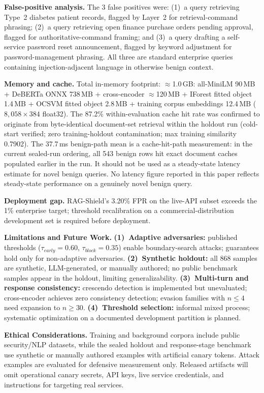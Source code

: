 ﻿\documentclass[conference]{IEEEtran}
\begin{document}
\textbf{False-positive analysis.}
The 3 false positives were: (1)~a query retrieving Type~2 diabetes patient
records, flagged by Layer~2 for retrieval-command phrasing; (2)~a query
retrieving open finance purchase orders pending approval, flagged for
authoritative-command framing; and (3)~a query drafting a self-service
password reset announcement, flagged by keyword adjustment for
password-management phrasing.
All three are standard enterprise queries containing injection-adjacent
language in otherwise benign context.

\textbf{Memory and cache.}
Total in-memory footprint: $\approx$1.0\,GB: all-MiniLM 90\,MB + DeBERTa
ONNX 738\,MB + cross-encoder $\approx$120\,MB + IForest fitted object
1.4\,MB + OCSVM fitted object 2.8\,MB + training corpus embeddings 12.4\,MB
($8{,}058 \times 384$ float32).
The 87.2\% within-evaluation cache hit rate was confirmed to originate from
byte-identical document-set retrieval within the holdout run (cold-start
verified; zero training-holdout contamination; max training similarity
0.7902).
The 37.7\,ms benign-path mean is a cache-hit-path measurement: in the current
sealed-run ordering, all 543 benign rows hit exact document caches populated
earlier in the run. It should not be used as a steady-state latency estimate
for novel benign queries. No latency figure reported in this paper reflects
steady-state performance on a genuinely novel benign query.

\textbf{Deployment gap.}
RAG-Shield's 3.20\% FPR on the live-API subset exceeds the 1\% enterprise
target; threshold recalibration on a commercial-distribution development set
is required before deployment.

\textbf{Limitations and Future Work.}
\textbf{(1)~Adaptive adversaries:} published thresholds ($\tau_{early}=0.60$,
$\tau_{block}=0.35$) enable boundary-search attacks; guarantees hold only
for non-adaptive adversaries.
\textbf{(2)~Synthetic holdout:} all 868 samples are synthetic,
LLM-generated, or manually authored; no public benchmark samples appear in
the holdout, limiting generalizability.
\textbf{(3)~Multi-turn and response consistency:} crescendo detection is
implemented but unevaluated; cross-encoder achieves zero consistency
detection; evasion families with $n \leq 4$ need expansion to $n \geq 30$.
\textbf{(4)~Threshold selection:} informal mixed process; systematic
optimization on a documented development partition is planned.

\textbf{Ethical Considerations.}
Training and background corpora include public security/NLP datasets, while
the sealed holdout and response-stage benchmark use synthetic or manually
authored examples with artificial canary tokens.
Attack examples are evaluated for defensive measurement only.
Released artifacts will omit operational canary secrets, API keys, live
service credentials, and instructions for targeting real services.
\end{document}
